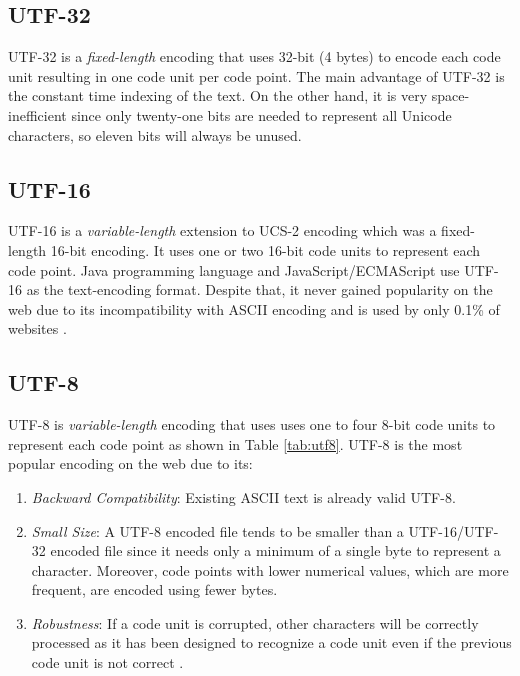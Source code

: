 \subsection{UTF-32}
UTF-32 is a \textit{fixed-length} encoding that uses 32-bit (4 bytes) to encode each code unit resulting in one code unit per code point. The main advantage of UTF-32 is the constant time indexing of the text. On the other hand, it is very space-inefficient since only twenty-one bits are needed to represent all Unicode characters, so eleven bits will always be unused.

\subsection{UTF-16}
UTF-16 is a \textit{variable-length} extension to UCS-2 encoding which was a fixed-length 16-bit encoding. It uses one or two 16-bit code units to represent each code point. Java programming language and JavaScript/ECMAScript use UTF-16 as the text-encoding format. Despite that, it never gained popularity on the web due to its incompatibility with ASCII encoding and is used by only 0.1\% of websites \cite{utf16usage}.

\subsection{UTF-8}
UTF-8 is \textit{variable-length} encoding that uses uses one to four 8-bit code units to represent each code point as shown in Table \ref{tab:utf8}. UTF-8 is the most popular encoding on the web \cite{utf8usage} due to its:
\begin{enumerate}
    \item \textit{Backward Compatibility}: Existing ASCII text is already valid UTF-8.
    \item \textit{Small Size}: A UTF-8 encoded file tends to be smaller than a UTF-16/UTF-32 encoded file since it needs only a minimum of a single byte to represent a character. Moreover, code points with lower numerical values, which are more frequent, are encoded using fewer bytes.
    \item \textit{Robustness}: If a code unit is corrupted, other characters will be correctly processed as it has been designed to recognize a code unit even if the previous code unit is not correct \cite{unicodeexplainedbook}.
\end{enumerate}

